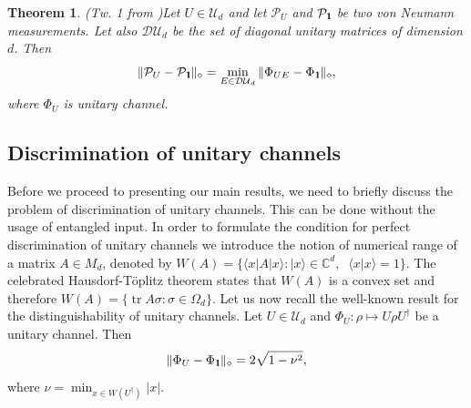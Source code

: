 \documentclass[11pt,a4paper,reqno, oneside]{amsart}
\DeclareMathOperator{\tr}{tr}
\newcommand{\C}{\ensuremath{\mathbb{C}}}
\newcommand{\ket}[1]{\ensuremath{|#1\rangle}}
\newcommand{\bra}[1]{\ensuremath{\langle#1|}}
\newcommand{\braket}[2]{\ensuremath{\langle{#1}|{#2}\rangle}}
\newcommand{\1}{{\rm 1\hspace{-0.9mm}l}}
\newcommand{\Id}{{\rm 1\hspace{-0.9mm}l}}
\newcommand{\PP}{\mathcal{P}}
\newcommand{\UU}{\mathcal{U}}
\newcommand{\diaguni}{\ensuremath{\mathcal{DU}}}
\newtheorem{theorem}{Theorem}
\begin{document}
\begin{theorem}(Tw. 1 from \cite{puchala2018strategies})\label{th:minE}
	Let $U\in \UU_d$ and let $\PP_U$ and $\PP_\Id$ be two von Neumann 
	measurements. 
	Let also 
	$\diaguni_d$ be the set of diagonal unitary matrices of dimension $d$. Then
	\begin{equation}
	\|\PP_U - \PP_\Id\|_\diamond = \min_{E \in \diaguni_d} \|\Phi_{UE} - 
	\Phi_\Id\|_\diamond,
	\end{equation}
	where $\Phi_U$ is unitary channel.
\end{theorem}


\subsection{Discrimination of unitary channels}

Before we proceed to presenting our main results, we need to briefly discuss the
problem of discrimination of unitary channels. This can be done without the
usage of entangled input. In order to formulate the condition for perfect
discrimination of unitary channels we introduce the notion of numerical range of
a matrix $A \in M_d$, denoted by $W(A) =\{\bra{x}A\ket{x}: \ket{x} \in \C^d, \;
\;\braket{x}{x}=1\}$. The celebrated Hausdorf-T\"oplitz
theorem states that
$W(A)$ is a convex set and therefore $W(A) =\{\tr A \sigma : \sigma \in \Omega_d
\}$. Let us now recall the well-known result for the
distinguishability of unitary channels.
	Let $U \in \UU_d$ and $\Phi_U: \rho \mapsto U \rho U^\dagger$ be a unitary 
	channel. 
	Then 
	\begin{equation}
	\| \Phi_U  - \Phi_{\1} \|_\diamond = 2 \sqrt{1-\nu^2},
	\end{equation}
	where $\nu = \min_{x \in W(U^\dagger)} |x|  $. 
\end{document}
